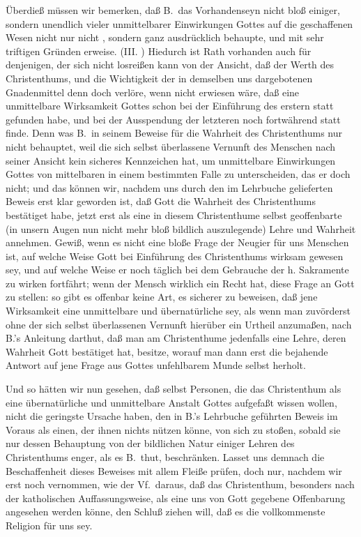 Überdieß müssen wir bemerken, daß B.\ das Vorhandenseyn nicht bloß einiger, sondern unendlich vieler unmittelbarer Einwirkungen Gottes auf die geschaffenen Wesen nicht nur nicht , sondern ganz ausdrücklich behaupte, und mit sehr triftigen Gründen erweise. (III. ) Hiedurch ist Rath vorhanden auch für denjenigen, der sich nicht losreißen kann von der Ansicht, daß der Werth des Christenthums, und die Wichtigkeit der in demselben uns dargebotenen Gnadenmittel denn doch verlöre, wenn nicht erwiesen wäre, daß eine unmittelbare Wirksamkeit Gottes schon bei der Einführung des erstern statt gefunden habe, und bei der Ausspendung der letzteren noch fortwährend statt finde. Denn was B.\ in seinem Beweise für die Wahrheit des Christenthums nur nicht behauptet, weil die sich selbst überlassene Vernunft des Menschen nach seiner Ansicht kein sicheres Kennzeichen hat, um unmittelbare Einwirkungen Gottes von mittelbaren in einem bestimmten Falle zu unterscheiden, das  er doch nicht; und das können wir, nachdem uns durch den im Lehrbuche gelieferten Beweis erst klar geworden ist, daß Gott die Wahrheit des Christenthums bestätiget habe, jetzt erst als eine in diesem Christenthume selbst geoffenbarte (in unsern Augen nun nicht mehr bloß bildlich auszulegende) Lehre und Wahrheit annehmen. Gewiß, wenn es nicht eine bloße Frage der Neugier für uns Menschen ist, auf welche Weise Gott bei Einführung des Christenthums wirksam gewesen sey, und auf welche Weise er noch täglich bei dem Gebrauche der h. Sakramente zu wirken fortfährt; wenn der Mensch wirklich ein Recht hat, diese Frage an Gott zu stellen: so gibt es offenbar keine Art, es sicherer zu beweisen, daß jene Wirksamkeit eine unmittelbare und übernatürliche sey, als wenn man zuvörderst ohne der sich selbst überlassenen Vernunft hierüber ein Urtheil anzumaßen, nach B.'s Anleitung darthut, daß man am Christenthume jedenfalls eine Lehre, deren Wahrheit Gott bestätiget hat, besitze, worauf man dann erst die bejahende Antwort auf jene Frage aus Gottes unfehlbarem Munde selbst herholt. \par 
Und so hätten wir nun gesehen, daß selbst Personen, die das Christenthum als eine übernatürliche und unmittelbare  Anstalt Gottes aufgefaßt wissen wollen, nicht die geringste Ursache haben, den in B.'s Lehrbuche geführten Beweis im Voraus als einen, der ihnen nichts nützen könne, von sich zu stoßen, sobald sie nur dessen Behauptung von der bildlichen Natur einiger Lehren des Christenthums enger, als es B.\ thut, beschränken. Lasset uns demnach die Beschaffenheit dieses Beweises mit allem Fleiße prüfen, doch nur, nachdem wir erst noch vernommen, wie der Vf.\ daraus, daß das Christenthum, besonders nach der katholischen Auffassungsweise, als eine uns von Gott gegebene Offenbarung angesehen werden könne, den Schluß ziehen will, daß es die vollkommenste Religion für uns sey. \par 
